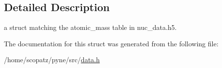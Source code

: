 \subsection{Detailed Description}
a struct matching the atomic\-\_\-mass table in nuc\-\_\-data.\-h5. 

The documentation for this struct was generated from the following file\-:\begin{DoxyCompactItemize}
\item 
/home/scopatz/pyne/src/\hyperlink{data_8h}{data.\-h}\end{DoxyCompactItemize}
